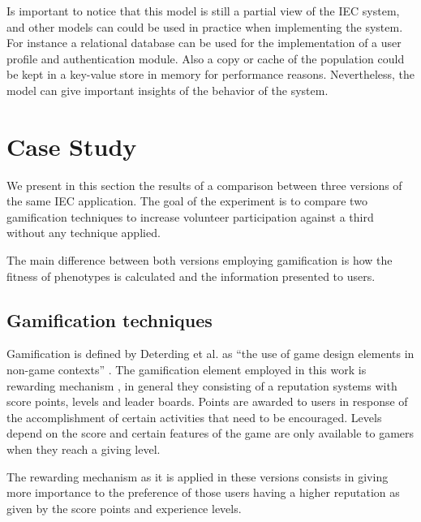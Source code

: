 \documentclass[conference]{IEEEtran}
\begin{document}
Is important to notice that this model is still a partial view of the IEC system,
and other models can could be used in practice when implementing the
system. %
For instance a relational database can be used for the implementation of a
user profile and authentication module. Also a copy or cache of the population 
could be kept in a key-value store in memory for performance reasons. 
Nevertheless, the model can give important insights of the behavior of the 
system.   %

\section{Case Study}
\label{sec:experiments}

We present in this section the results of a comparison between three versions
of the same IEC application. The goal of the experiment is to compare two 
gamification techniques to increase volunteer participation against a third 
without any technique applied.

The main difference between both versions employing gamification is how the fitness of phenotypes
is calculated and the information presented to users. 

\subsection{Gamification techniques}
\label{sec:gamification}

Gamification is defined by Deterding et al. as
``the use of game design elements in non-game contexts'' \cite{deterding2011game}.
The gamification element employed in this work is rewarding mechanism 
\cite{dubois2013understanding}, in general they consisting of a reputation systems with score points, 
levels and leader boards. Points are awarded to users in response of
the accomplishment of certain activities that need to be encouraged. Levels depend
on the score and certain features of the game are only available to gamers when 
they reach a giving level.

The rewarding mechanism as it is applied in these versions 
consists in giving more importance to the preference of those users having a higher reputation
as given by the score points and experience levels.  
\end{document}
